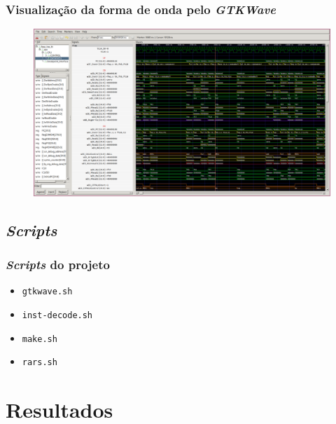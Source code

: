 \documentclass[aspectratio=169]{beamer}
\begin{document}
    \begin{frame}
        \frametitle{Visualização da forma de onda pelo \textit{GTKWave}}
        \vfill
        \begin{figure}[H]
        \centering
            \includegraphics[width=.9\textwidth,height=.85\textheight,keepaspectratio]
            {../images/gtkwave/random.png}
        \end{figure}
        \vfill
    \end{frame}

    \subsection{\textit{Scripts}}
    \begin{frame}
        \frametitle{\textit{Scripts} do projeto}
        \vfill
        \begin{itemize}
            \item \texttt{gtkwave.sh}
            \item \texttt{inst-decode.sh}
            \item \texttt{make.sh}
            \item \texttt{rars.sh}
        \end{itemize}
        \vfill
    \end{frame}

\section{Resultados}
\end{document}
